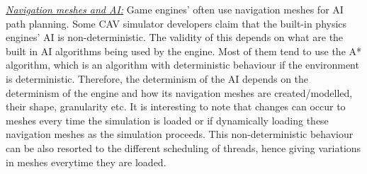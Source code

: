 %
\noindent\underline{\textit{Navigation meshes and AI:}}
Game engines' often use navigation meshes for AI path planning. Some CAV simulator developers claim that the built-in physics engines' AI is non-deterministic\cite{CARLABenchmark}. 
The validity of this depends on what are the built in AI algorithms being used by the engine. 
Most of them tend to use the A* algorithm\cite{AStarBook}, which is an algorithm with deterministic behaviour if the environment is deterministic\cite{AirsimUnrealArticle}\cite{UnrealAIDocumentation}. 
Therefore, the determinism of the AI depends on the determinism of the engine and how its navigation meshes are created/modelled, their shape, granularity etc. It is interesting to note that changes can occur to meshes every time the simulation is loaded or if dynamically loading these navigation meshes as the simulation proceeds. This non-deterministic behaviour can be also resorted to the different scheduling of threads, hence giving variations in meshes everytime they are loaded.


